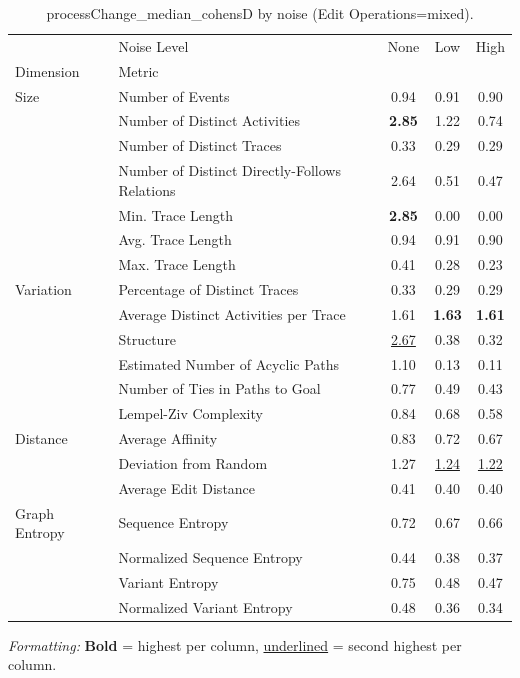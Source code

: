 \begin{table}[H]
\centering
\scriptsize
\caption{processChange_median_cohensD by noise (Edit Operations=mixed).}
\label{tab:processchange-median-cohensd-by-noise}
\setlength{\tabcolsep}{2pt}  %
\begin{tabular}{llccc}
\toprule
              & Noise Level &  None &  Low &  High \\
Dimension & Metric &       &      &       \\
\midrule
Size & Number of Events & 0.94 & 0.91 & 0.90 \\
              & Number of Distinct Activities & \textbf{2.85} & 1.22 & 0.74 \\
              & Number of Distinct Traces & 0.33 & 0.29 & 0.29 \\
              & Number of Distinct Directly-Follows Relations & 2.64 & 0.51 & 0.47 \\
              & Min. Trace Length & \textbf{2.85} & 0.00 & 0.00 \\
              & Avg. Trace Length & 0.94 & 0.91 & 0.90 \\
              & Max. Trace Length & 0.41 & 0.28 & 0.23 \\
Variation & Percentage of Distinct Traces & 0.33 & 0.29 & 0.29 \\
              & Average Distinct Activities per Trace & 1.61 & \textbf{1.63} & \textbf{1.61} \\
              & Structure & \underline{2.67} & 0.38 & 0.32 \\
              & Estimated Number of Acyclic Paths & 1.10 & 0.13 & 0.11 \\
              & Number of Ties in Paths to Goal & 0.77 & 0.49 & 0.43 \\
              & Lempel-Ziv Complexity & 0.84 & 0.68 & 0.58 \\
Distance & Average Affinity & 0.83 & 0.72 & 0.67 \\
              & Deviation from Random & 1.27 & \underline{1.24} & \underline{1.22} \\
              & Average Edit Distance & 0.41 & 0.40 & 0.40 \\
Graph Entropy & Sequence Entropy & 0.72 & 0.67 & 0.66 \\
              & Normalized Sequence Entropy & 0.44 & 0.38 & 0.37 \\
              & Variant Entropy & 0.75 & 0.48 & 0.47 \\
              & Normalized Variant Entropy & 0.48 & 0.36 & 0.34 \\
\bottomrule
\end{tabular}
\vspace{2pt}
\begin{minipage}{\linewidth}
\centering
\scriptsize
\tiny
\textit{Formatting:} \textbf{Bold} = highest per column, \underline{underlined} = second highest per column.
\end{minipage}
\end{table}

